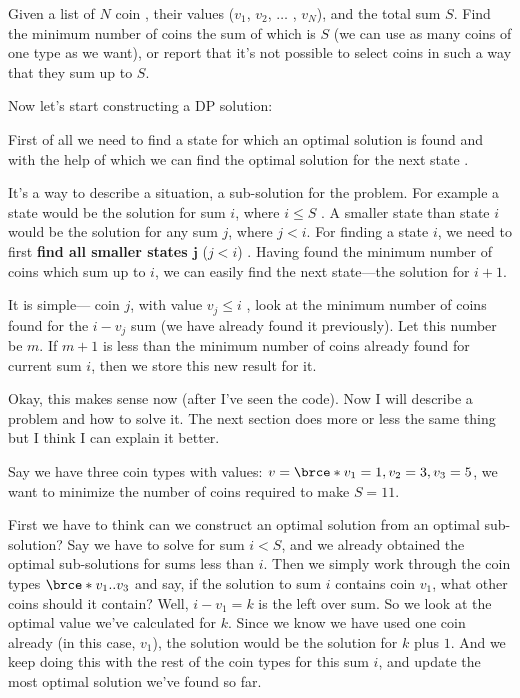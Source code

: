 Given a list of $N$ coin , their values ($v_1$, $v_2$,
$\ldots$ , $v_N$), and the total sum $S$.  Find the minimum number of coins
the sum of which is $S$ (we can use as many coins of one type as we want),
or report that it's not possible to select coins in such a way that they sum
up to $S$.

Now let's start constructing a DP solution:

First of all we need to find a state for which an optimal solution is found
 and with the help of which we can
find the optimal solution for the next state .


It's a way to describe a situation, a sub-solution for the problem. For
example a state would be the solution for sum $i$, where $i\leq S$
. A smaller state than state $i$ would be the
solution for any sum $j$, where $j<i$. For finding a state $i$, we need to
first \textbf{find all smaller states $\bm{j}$} ($j<i$) . Having found the
minimum number of coins which sum up to $i$, we can easily find the next
state---the solution for $i+1$.


It is simple--- coin $j$, with value $v_j\leq i$
, look at the minimum number of coins
found for the $i-v_j$ sum (we have already found it previously). Let this
number be $m$. If $m+1$ is less than the minimum number of coins already
found for current sum $i$, then we store this new result for it.

\RayNotesBegin

Okay, this makes sense now (after I've seen the code). Now I will describe a
problem and how to solve it. The next section does more or less the same
thing but I think I can explain it better.

Say we have three coin types with values: $v = \brce*{v_1 = 1, v_2 = 3, v_3
  = 5}$, we want to minimize the number of coins required to make $S=11$.

First we have to think can we construct an optimal solution from an optimal
sub-solution? Say we have to solve for sum $i<S$, and we already obtained
the optimal sub-solutions for sums less than $i$. Then we simply work
through the coin types $\brce*{v_1..v_3}$ and say, if the solution to sum
$i$ contains coin $v_1$, what other coins should it contain? Well, $i - v_1
= k$ is the left over sum. So we look at the optimal value we've calculated
for $k$. Since we know we have used one coin already (in this case, $v_1$),
the solution would be the solution for $k$ plus $1$. And we keep doing this
with the rest of the coin types for this sum $i$, and update the most
optimal solution we've found so far.

